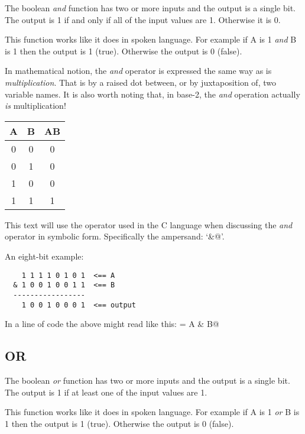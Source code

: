 The boolean {\em and} function has two or more inputs and the output is a
single bit.  The output is 1 if and only if all of the input values are 1.
Otherwise it is 0.

This function works like it does in spoken language.  For example
if A is 1 {\em and} B is 1 then the output is 1 (true).
Otherwise the output is 0 (false).  

In mathematical notion, the {\em and} operator is expressed the same way
as is {\em multiplication}.  That is by a raised dot between, or by 
juxtaposition of, two variable names.  It is also worth noting that,
in base-2, the {\em and} operation actually {\em is} multiplication!

\begin{center}
\begin{tabular}{cc|c}
A & B & AB \\
\hline
0 & 0 & 0 \\
0 & 1 & 0 \\
1 & 0 & 0 \\
1 & 1 & 1 \\
\end{tabular}
\end{center}

This text will use the operator used in the C language when discussing 
the {\em and} operator in symbolic form.  Specifically the ampersand: `\verb@&@'.

An eight-bit example:

\begin{verbatim}
    1 1 1 1 0 1 0 1  <== A
  & 1 0 0 1 0 0 1 1  <== B
  -----------------
    1 0 0 1 0 0 0 1  <== output
\end{verbatim}

In a line of code the above might read like this: \verb@output = A & B@

\subsection{OR}

The boolean {\em or} function has two or more inputs and the output is a
single bit.  The output is 1 if at least one of the input values are 1.

This function works like it does in spoken language.  For example
if A is 1 {\em or} B is 1 then the output is 1 (true).
Otherwise the output is 0 (false).  

